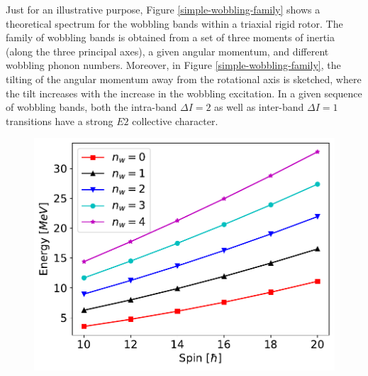\documentclass[11pt]{article}
\begin{document}
Just for an illustrative purpose, Figure \ref{simple-wobbling-family} shows a theoretical spectrum for the wobbling bands within a triaxial rigid rotor. The family of wobbling bands is obtained from a set of three moments of inertia (along the three principal axes), a given angular momentum, and different wobbling phonon numbers. Moreover, in Figure \ref{simple-wobbling-family}, the tilting of the angular momentum away from the rotational axis is sketched, where the tilt increases with the increase in the wobbling excitation. In a given sequence of wobbling bands, both the intra-band $\Delta I=2$ as well as inter-band $\Delta I=1$ transitions have a strong $E2$ collective character.

\begin{figure}
\centering
\begin{minipage}{.6\textwidth}
  \centering
  \includegraphics[width=1\linewidth]{figs/simple_wobbling_spectrum.pdf}
\end{minipage}%
\begin{minipage}{.4\textwidth}
  \centering

\end{minipage}
\end{figure}
\end{document}
